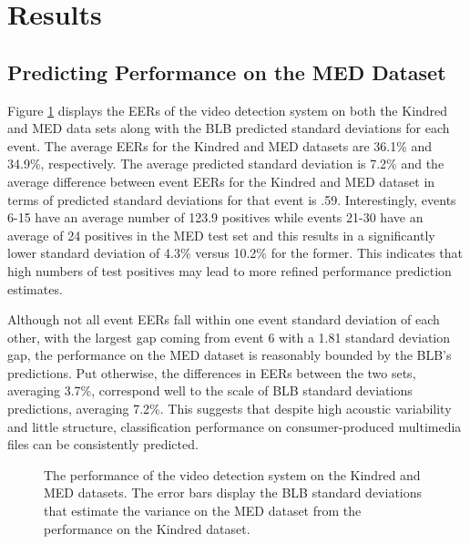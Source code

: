 
\section{Results}

\subsection{Predicting Performance on the MED Dataset}

Figure \ref{fig:blb} displays the EERs of the video detection system on both the Kindred and MED data sets along with the BLB predicted standard deviations for each event. 
The average EERs for the Kindred and MED datasets are 36.1\% and 34.9\%, respectively. 
The average predicted standard deviation is 7.2\% and the average difference between event EERs for the Kindred and MED dataset in terms of predicted standard deviations for that event is .59. 
Interestingly, events 6-15 have an average number of 123.9 positives while events 21-30 have an average of 24 positives in the MED test set and this results in a significantly lower standard deviation of 4.3\% versus 10.2\% for the former. 
This indicates that high numbers of test positives may lead to more refined performance prediction estimates. 

Although not all event EERs fall within one event standard deviation of each other, with the largest gap coming from event 6 with a 1.81 standard deviation gap, the performance on the MED dataset is reasonably bounded by the BLB's predictions. 
Put otherwise, the differences in EERs between the two sets, averaging 3.7\%, correspond well to the scale of BLB standard deviations predictions, averaging 7.2\%.
This suggests that despite high acoustic variability and little structure, classification performance on consumer-produced multimedia files can be consistently predicted. 

\begin{figure}[ht]
\centering
{}
\caption{The performance of the video detection system on the Kindred and MED datasets. 
 The error bars display the BLB standard deviations that estimate the variance on the MED dataset from the performance on the Kindred dataset.}
\label{fig:blb}
\end{figure}


